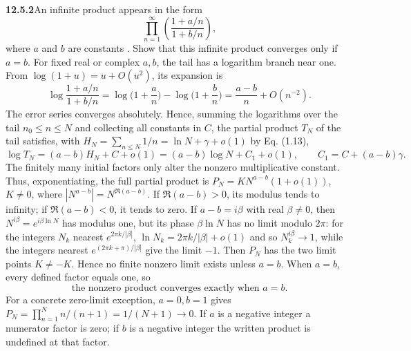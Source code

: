 \par\bigskip
\noindent\textbf{12.5.2}\quad An infinite product appears in the form
\[
\prod_{n=1}^{\infty}\left(\frac{1+a/n}{1+b/n}\right),
\]
where $a$ and $b$ are constants . Show that this infinite product
converges  only if $a=b$.
\solution
{}
For fixed real or complex $a,b$, the tail has a logarithm branch near one.
From $\log(1+u)=u+O(u^2)$, its expansion is
\[
\log\frac{1+a/n}{1+b/n}
=\log\Big(1+\frac an\Big)-\log\Big(1+\frac bn\Big)
=\frac{a-b}{n}+O(n^{-2}).
\]
The error series converges absolutely. Hence, summing the logarithms
over the tail $n_0\le n\le N$ and collecting all constants in $C$, the
partial product $T_N$ of the tail satisfies, with
$H_N=\sum_{n\le N}1/n=\ln N+\gamma+o(1)$ by Eq. (1.13),
\[
\log T_N=(a-b)H_N+C+o(1)
=(a-b)\log N+C_1+o(1),\qquad C_1=C+(a-b)\gamma.
\]
The finitely many initial factors only alter the nonzero multiplicative
constant. Thus, exponentiating, the full partial product is
$P_N=K N^{a-b}(1+o(1))$, $K\ne0$, where
$|N^{a-b}|=N^{\Re(a-b)}$.
If $\Re(a-b)>0$, its modulus tends to infinity; if $\Re(a-b)<0$,
it tends to zero. If $a-b=i\beta$ with real $\beta\ne0$, then
$N^{i\beta}=e^{i\beta\ln N}$ has modulus one, but its phase
$\beta\ln N$ has no limit modulo $2\pi$: for the integers $N_k$ nearest
$e^{2\pi k/|\beta|}$, $\ln N_k=2\pi k/|\beta|+o(1)$ and so
$N_k^{i\beta}\to1$, while the integers nearest
$e^{(2\pi k+\pi)/|\beta|}$ give the limit $-1$. Then $P_N$ has the two
limit points $K\ne-K$. Hence no finite nonzero limit exists unless $a=b$.
When $a=b$, every defined factor equals one, so
\[
\boxed{\text{the nonzero product converges exactly when }a=b.}
\]
For a concrete zero-limit exception, $a=0,b=1$ gives
$P_N=\prod_{n=1}^N n/(n+1)=1/(N+1)\to0$.
If $a$ is a negative integer a numerator factor is zero; if $b$ is a
negative integer the written product is undefined at that factor.

